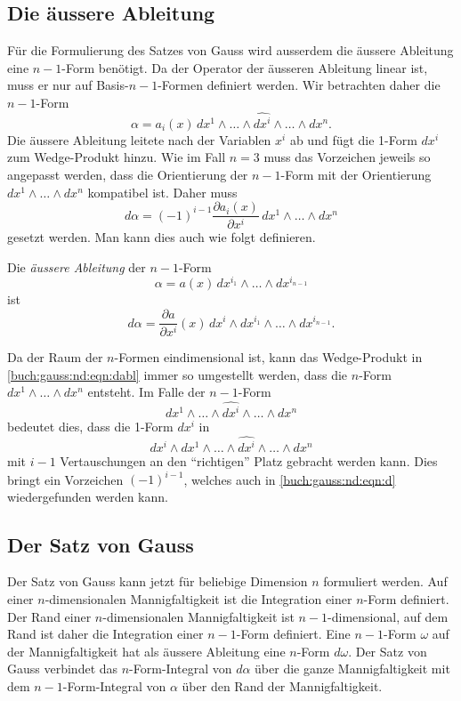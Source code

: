 %
%
\subsection{Die äussere Ableitung}
Für die Formulierung des Satzes von Gauss wird ausserdem die
äussere Ableitung eine $n-1$-Form benötigt.
Da der Operator der äusseren Ableitung linear ist, muss er nur
auf Basis-$n-1$-Formen definiert werden.
Wir betrachten daher die $n-1$-Form
\[
\alpha
=
a_i(x)\, dx^1\wedge\dots\wedge \widehat{dx^i}\wedge\dots\wedge dx^n.
\]
Die äussere Ableitung leitete nach der Variablen $x^i$ ab und fügt
die 1-Form $dx^i$ zum Wedge-Produkt hinzu.
Wie im Fall $n=3$ muss das Vorzeichen jeweils so angepasst werden,
dass die Orientierung der $n-1$-Form mit der Orientierung
$dx^1\wedge\dots\wedge dx^n$ kompatibel ist.
Daher muss
\begin{equation}
d\alpha
=
(-1)^{i-1}
\frac{\partial a_i(x)}{\partial x^i}
\,
dx^1\wedge\dots\wedge dx^n
\label{buch:gauss:nd:eqn:d}
\end{equation}
gesetzt werden.
Man kann dies auch wie folgt definieren.

\begin{definition}
Die {\em äussere Ableitung} der $n-1$-Form
\[
\alpha = a(x)\, dx^{i_1}\wedge\dots\wedge dx^{i_{n-1}}
\]
ist
\begin{equation}
d\alpha
=
\frac{\partial a}{\partial x^i}(x)
\,dx^i
\wedge dx^{i_1}\wedge\dots\wedge dx^{i_{n-1}}.
\label{buch:gauss:nd:eqn:dabl}
\end{equation}
\end{definition}

Da der Raum der $n$-Formen eindimensional ist, kann 
das Wedge-Produkt in \eqref{buch:gauss:nd:eqn:dabl}
immer so umgestellt werden, dass die $n$-Form
$dx^1\wedge\dots\wedge dx^n$ entsteht.
Im Falle der $n-1$-Form
\[
dx^1\wedge\dots\wedge\widehat{dx^i}\wedge\dots\wedge dx^n
\]
bedeutet dies, dass die 1-Form $dx^i$ in
\[
dx^i
\wedge
dx^1\wedge\dots\wedge\widehat{dx^i}\wedge\dots\wedge dx^n
\]
mit $i-1$ Vertauschungen an den ``richtigen'' Platz gebracht
werden kann.
Dies bringt ein Vorzeichen $(-1)^{i-1}$, welches auch in
\eqref{buch:gauss:nd:eqn:d}
wiedergefunden werden kann.

%
%
\subsection{Der Satz von Gauss
\label{buch:gauss:gauss:subsection:satzvongauss}}
Der Satz von Gauss kann jetzt für beliebige Dimension $n$ formuliert
werden.
Auf einer $n$-dimensionalen Mannigfaltigkeit ist die Integration
einer $n$-Form definiert.
Der Rand einer $n$-dimensionalen Mannigfaltigkeit ist $n-1$-dimensional,
auf dem Rand ist daher die Integration einer $n-1$-Form definiert.
Eine $n-1$-Form $\omega$ auf der Mannigfaltigkeit hat als äussere 
Ableitung eine $n$-Form $d\omega$.
Der Satz von Gauss verbindet das $n$-Form-Integral von $d\alpha$
über die ganze Mannigfaltigkeit mit dem $n-1$-Form-Integral von $\alpha$
über den Rand der Mannigfaltigkeit.

